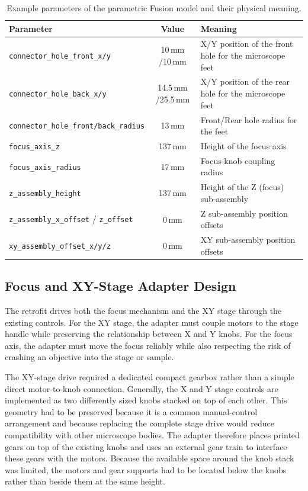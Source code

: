 \begin{table}[H]
    \centering
    \caption[Fusion model parameters]{Example parameters of the parametric Fusion model and their physical meaning.}
    \label{tab:fusion}
    \begin{tabular}{@{}l c L{6.2cm}@{}}
        \toprule
        \textbf{Parameter} & \textbf{Value} & \textbf{Meaning} \\
        \midrule
        \texttt{connector\_hole\_front\_x/y} & 10\,mm /10\,mm & X/Y position of the front hole for the microscope feet \\
        \texttt{connector\_hole\_back\_x/y}  & 14.5\,mm /25.5\,mm & X/Y position of the rear hole for the microscope feet \\
        \texttt{connector\_hole\_front/back\_radius} & 13\,mm & Front/Rear hole radius for the feet \\
        \texttt{focus\_axis\_z}      & 137\,mm & Height of the focus axis \\
        \texttt{focus\_axis\_radius} & 17\,mm  & Focus-knob coupling radius \\
        \texttt{z\_assembly\_height} & 137\,mm & Height of the Z (focus) sub-assembly \\
        \texttt{z\_assembly\_x\_offset} / \texttt{z\_offset} & 0\,mm & Z sub-assembly position offsets \\
        \texttt{xy\_assembly\_offset\_x/y/z} & 0\,mm & XY sub-assembly position offsets \\
        \bottomrule
    \end{tabular}
\end{table}

\subsection{Focus and XY-Stage Adapter Design}

The retrofit drives both the focus mechanism and the XY stage through the existing controls. For the XY stage, the adapter must couple motors to the stage handle while preserving the relationship between X and Y knobs. For the focus axis, the adapter must move the focus reliably while also respecting the risk of crashing an objective into the stage or sample.

The XY-stage drive required a dedicated compact gearbox rather than a simple direct motor-to-knob connection. Generally, the X and Y stage controls are implemented as two differently sized knobs stacked on top of each other. This geometry had to be preserved because it is a common manual-control arrangement and because replacing the complete stage drive would reduce compatibility with other microscope bodies. The adapter therefore places printed gears on top of the existing knobs and uses an external gear train to interface these gears with the motors. Because the available space around the knob stack was limited, the motors and gear supports had to be located below the knobs rather than beside them at the same height.

